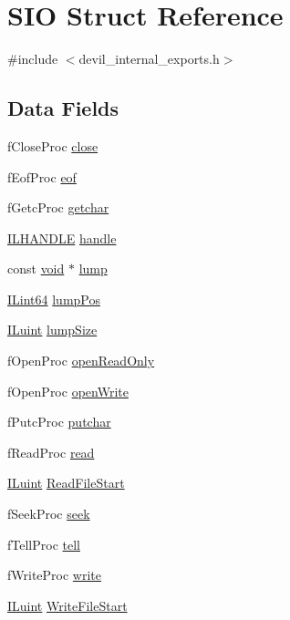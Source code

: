 \hypertarget{struct_s_i_o}{\section{S\-I\-O Struct Reference}
\label{struct_s_i_o}
}


{\ttfamily \#include $<$devil\-\_\-internal\-\_\-exports.\-h$>$}

\subsection*{Data Fields}
\begin{DoxyCompactItemize}
\item 
f\-Close\-Proc \hyperlink{struct_s_i_o_aa179397f07be189ced9425aa6345d44a}{close}
\item 
f\-Eof\-Proc \hyperlink{struct_s_i_o_a03a5e0026ca13d40331e03f11a5a3f96}{eof}
\item 
f\-Getc\-Proc \hyperlink{struct_s_i_o_ad8f9fd8070ae74def9716f2a4132ccc1}{getchar}
\item 
\hyperlink{il_8h_a2e3e6f3fab1fa3764f0802258f702d10}{I\-L\-H\-A\-N\-D\-L\-E} \hyperlink{struct_s_i_o_ad9abffca31e189317284eccc5d4ccd79}{handle}
\item 
const \hyperlink{il_8h_a5530e04d947bcddd83639ea7940faf10}{void} $\ast$ \hyperlink{struct_s_i_o_a01766410160a2e7119db1f2ed7e07573}{lump}
\item 
\hyperlink{il_8h_a2989461dc5019ed8c4c47043e67472c8}{I\-Lint64} \hyperlink{struct_s_i_o_a70e66ab40cafe546819e082dc829611f}{lump\-Pos}
\item 
\hyperlink{il_8h_ac6508d0e9c19e32f32e00d54b5b8cf30}{I\-Luint} \hyperlink{struct_s_i_o_ac78bd1234c9479fa0a7937560df4382c}{lump\-Size}
\item 
f\-Open\-Proc \hyperlink{struct_s_i_o_ad08bf2b5411a50d675e0c8da3b82f256}{open\-Read\-Only}
\item 
f\-Open\-Proc \hyperlink{struct_s_i_o_ab8cf90da8750b39dc8a9f6cfeffa993a}{open\-Write}
\item 
f\-Putc\-Proc \hyperlink{struct_s_i_o_a9c41ef1e36eead4cf4a7831ee4ef58d4}{putchar}
\item 
f\-Read\-Proc \hyperlink{struct_s_i_o_ad0809e10a6dbc29094df8886b91a650d}{read}
\item 
\hyperlink{il_8h_ac6508d0e9c19e32f32e00d54b5b8cf30}{I\-Luint} \hyperlink{struct_s_i_o_a4053b453e860e4985bdfa6a18bff377e}{Read\-File\-Start}
\item 
f\-Seek\-Proc \hyperlink{struct_s_i_o_a9734eede77c6c81945c04c9c8e427b53}{seek}
\item 
f\-Tell\-Proc \hyperlink{struct_s_i_o_ac9e7b5d23d9c678b923ad470fd50f477}{tell}
\item 
f\-Write\-Proc \hyperlink{struct_s_i_o_a9ed6c0e54e1f68ab4b0c553593b4d175}{write}
\item 
\hyperlink{il_8h_ac6508d0e9c19e32f32e00d54b5b8cf30}{I\-Luint} \hyperlink{struct_s_i_o_a57300546bbca3a4e10398880f97b67c7}{Write\-File\-Start}
\end{DoxyCompactItemize}


